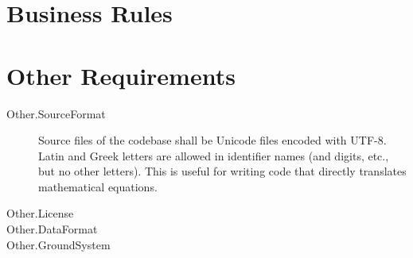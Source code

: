 \section{Business Rules}


\section{Other Requirements}


\begin{description}
\item[Other.SourceFormat] Source files of the codebase shall be
  Unicode files encoded with UTF-8. Latin and Greek letters are
  allowed in identifier names (and digits, etc., but no other
  letters). This is useful for writing code that directly translates
  mathematical equations.

\item[Other.License] 

\item[Other.DataFormat] 

\item[Other.GroundSystem] 
\end{description}
